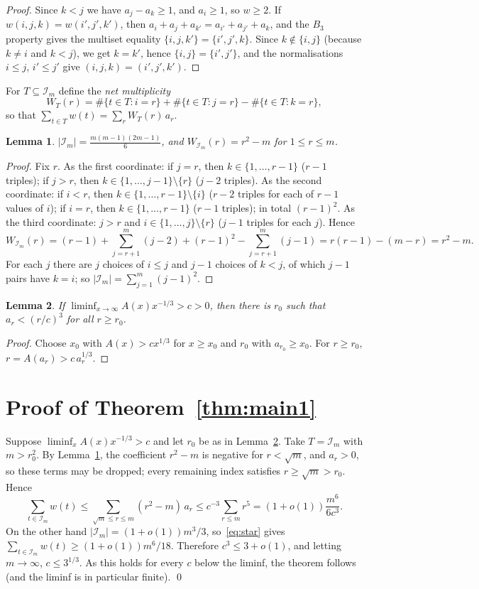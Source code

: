 \documentclass[11pt]{amsart}
\newtheorem{lemma}{Lemma}
\theoremstyle{remark}
\newcommand{\I}{\mathcal{I}}
\begin{document}
\begin{proof}
Since $k<j$ we have $a_j-a_k\ge1$, and $a_i\ge1$, so $w\ge2$. If $w(i,j,k)=w(i',j',k')$, then $a_i+a_j+a_{k'}=a_{i'}+a_{j'}+a_k$, and the $B_3$ property gives the multiset equality $\{i,j,k'\}=\{i',j',k\}$. Since $k\notin\{i,j\}$ (because $k\ne i$ and $k<j$), we get $k=k'$, hence $\{i,j\}=\{i',j'\}$, and the normalisations $i\le j$, $i'\le j'$ give $(i,j,k)=(i',j',k')$.
\end{proof}

For $T\subseteq\I_m$ define the \emph{net multiplicity}
\[
W_T(r)=\#\{t\in T: i=r\}+\#\{t\in T: j=r\}-\#\{t\in T: k=r\},
\]
so that $\sum_{t\in T}w(t)=\sum_r W_T(r)\,a_r$.

\begin{lemma}\label{lem:B}
$|\I_m|=\frac{m(m-1)(2m-1)}{6}$, and $W_{\I_m}(r)=r^2-m$ for $1\le r\le m$.
\end{lemma}

\begin{proof}
Fix $r$. As the first coordinate: if $j=r$, then $k\in\{1,\dots,r-1\}$ ($r-1$ triples); if $j>r$, then $k\in\{1,\dots,j-1\}\setminus\{r\}$ ($j-2$ triples). As the second coordinate: if $i<r$, then $k\in\{1,\dots,r-1\}\setminus\{i\}$ ($r-2$ triples for each of $r-1$ values of $i$); if $i=r$, then $k\in\{1,\dots,r-1\}$ ($r-1$ triples); in total $(r-1)^2$. As the third coordinate: $j>r$ and $i\in\{1,\dots,j\}\setminus\{r\}$ ($j-1$ triples for each $j$). Hence
\[
W_{\I_m}(r)=(r-1)+\sum_{j=r+1}^m(j-2)+(r-1)^2-\sum_{j=r+1}^m(j-1)=r(r-1)-(m-r)=r^2-m .
\]
For each $j$ there are $j$ choices of $i\le j$ and $j-1$ choices of $k<j$, of which $j-1$ pairs have $k=i$; so $|\I_m|=\sum_{j=1}^m(j-1)^2$.
\end{proof}

\begin{lemma}\label{lem:C}
If $\liminf_{x\to\infty}A(x)x^{-1/3}>c>0$, then there is $r_0$ such that $a_r<(r/c)^3$ for all $r\ge r_0$.
\end{lemma}

\begin{proof}
Choose $x_0$ with $A(x)>cx^{1/3}$ for $x\ge x_0$ and $r_0$ with $a_{r_0}\ge x_0$. For $r\ge r_0$, $r=A(a_r)>c\,a_r^{1/3}$.
\end{proof}

\section{Proof of Theorem~\ref{thm:main1}}

Suppose $\liminf_x A(x)x^{-1/3}>c$ and let $r_0$ be as in Lemma~\ref{lem:C}. Take $T=\I_m$ with $m>r_0^2$. By Lemma~\ref{lem:B}, the coefficient $r^2-m$ is negative for $r<\sqrt m$, and $a_r>0$, so these terms may be dropped; every remaining index satisfies $r\ge\sqrt m>r_0$. Hence
\[
\sum_{t\in\I_m}w(t)\le\sum_{\sqrt m\le r\le m}(r^2-m)\,a_r\le c^{-3}\sum_{r\le m}r^5=(1+o(1))\frac{m^6}{6c^3}.
\]
On the other hand $|\I_m|=(1+o(1))m^3/3$, so~\eqref{eq:star} gives $\sum_{t\in\I_m}w(t)\ge(1+o(1))m^6/18$. Therefore $c^3\le3+o(1)$, and letting $m\to\infty$, $c\le3^{1/3}$. As this holds for every $c$ below the liminf, the theorem follows (and the liminf is in particular finite). \qed
\end{document}
